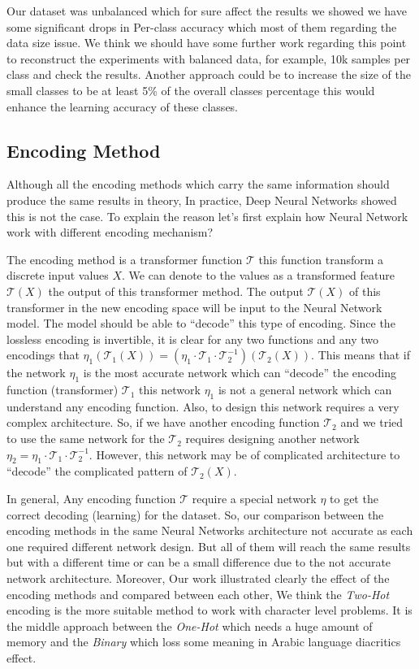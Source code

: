 Our dataset was unbalanced which for sure affect the results we showed we have some significant drops in Per-class accuracy which most of them regarding the data size issue. We think we should have some further work regarding this point to reconstruct the experiments with balanced data, for example, 10k samples per class and check the results. Another approach could be to increase the size of the small classes to be at least 5\% of the overall classes percentage this would enhance the learning accuracy of these classes.  
\subsection{Encoding Method}

Although all the encoding methods which carry the same information should produce the same results in theory, In practice, Deep Neural Networks showed this is not the case. To explain the reason let’s first explain how Neural Network work with different encoding mechanism?

The encoding method is a transformer function $\mathcal{T}$ this function transform a discrete input values $X$. We can denote to the values as a transformed feature $\mathcal{T}(X)$ the output of this transformer method. The output $\mathcal{T}(X)$ of this transformer in the new encoding space will be input to the Neural Network model. The model should be able to ``decode''  this type of encoding. Since the lossless encoding is invertible, it is clear for any two functions and any two encodings that $\eta_1\left(\mathcal{T}_1(X)\right) = \left(\eta_1\cdot\mathcal{T}_1\cdot \mathcal{T}_2^{-1} \right)\left(\mathcal{T}_2(X)\right)$. This means that if the network $\eta_1$ is the most accurate network which can ``decode'' the encoding function (transformer) $\mathcal{T}_1$ this network $\eta_1$ is not a general network which can understand any encoding function. Also, to design this network requires a very complex architecture. So, if we have another encoding function $\mathcal{T}_2$ and we tried to use the same network for the $\mathcal{T}_2$ requires designing another network $\eta_2 = \eta_1\cdot\mathcal{T}_1\cdot \mathcal{T}_2^{-1}$. However, this network may be of complicated architecture to ``decode'' the complicated pattern of $\mathcal{T}_2(X)$.

In general, Any encoding function $\mathcal{T}$ require a special network $\eta$ to get the correct decoding (learning) for the dataset. So, our comparison between the encoding methods in the same Neural Networks architecture not accurate as each one required different network design. But all of them will reach the same results but with a different time or can be a small difference due to the not accurate network architecture. Moreover, Our work illustrated clearly the effect of the encoding methods and compared between each other, We think the \textit{Two-Hot} encoding is the more suitable method to work with character level problems. It is the middle approach between the \textit{One-Hot} which needs a huge amount of memory and the \textit{Binary} which loss some meaning in Arabic language diacritics effect.


